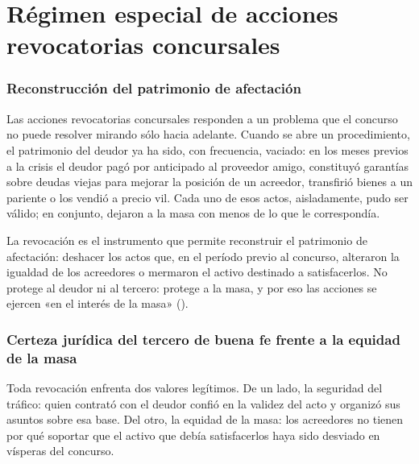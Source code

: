 \chapter{Régimen especial de acciones revocatorias concursales}
\label{cap:revocatorias}


\bloqueTeorico

\subsection{Reconstrucción del patrimonio de afectación}

Las acciones revocatorias concursales responden a un problema que el concurso no puede
resolver mirando sólo hacia adelante. Cuando se abre un procedimiento, el patrimonio del
deudor ya ha sido, con frecuencia, vaciado: en los meses previos a la crisis el deudor pagó
por anticipado al proveedor amigo, constituyó garantías sobre deudas viejas para mejorar la
posición de un acreedor, transfirió bienes a un pariente o los vendió a precio vil. Cada uno
de esos actos, aisladamente, pudo ser válido; en conjunto, dejaron a la masa con menos de lo
que le correspondía.

La revocación es el instrumento que permite reconstruir el patrimonio de afectación:
deshacer los actos que, en el período previo al concurso, alteraron la igualdad de los
acreedores o mermaron el activo destinado a satisfacerlos. No protege al deudor ni al
tercero: protege a la masa, y por eso las acciones se ejercen «en el interés de la masa»
().

\subsection{Certeza jurídica del tercero de buena fe frente a la equidad de la masa}

Toda revocación enfrenta dos valores legítimos. De un lado, la seguridad del tráfico: quien
contrató con el deudor confió en la validez del acto y organizó sus asuntos sobre esa base.
Del otro, la equidad de la masa: los acreedores no tienen por qué soportar que el activo que
debía satisfacerlos haya sido desviado en vísperas del concurso.

